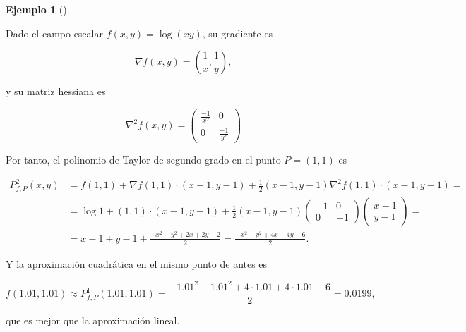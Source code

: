\documentclass[
  a4paper,
]{scrreport}
\theoremstyle{definition}
\theoremstyle{plain}
\theoremstyle{plain}
\theoremstyle{definition}
\theoremstyle{definition}
\newtheorem{example}{Ejemplo}[chapter]
\theoremstyle{plain}
\theoremstyle{remark}
\begin{document}
\begin{example}[]\protect\hypertarget{exm-polinomio-taylor-funcion-varias-variables}{}\label{exm-polinomio-taylor-funcion-varias-variables}

Dado el campo escalar \(f(x,y)=\log(xy)\), su gradiente es

\[
\nabla f(x,y) = \left(\frac{1}{x},\frac{1}{y}\right),
\]

y su matriz hessiana es

\[
\nabla ^2 f(x,y) 
= \left(
\begin{array}{cc}
\frac{-1}{x^2} & 0\\
0 & \frac{-1}{y^2}
\end{array}
\right)
\]

Por tanto, el polinomio de Taylor de segundo grado en el punto
\(P=(1,1)\) es

\begin{align*}
P^2_{f,P}(x,y) &= f(1,1) +\nabla f(1,1)\cdot (x-1,y-1) + \frac{1}{2}(x-1,y-1)\nabla^2f(1,1)\cdot(x-1,y-1)=\\
&= \log 1+(1,1)\cdot(x-1,y-1) + \frac{1}{2}(x-1,y-1)
\left(
\begin{array}{cc}
-1 & 0\\
0 & -1
\end{array}
\right)
\left(
\begin{array}{c}
x-1\\
y-1
\end{array}
\right)
= \\
&= x-1+y-1+\frac{-x^2-y^2+2x+2y-2}{2} = \frac{-x^2-y^2+4x+4y-6}{2}.
\end{align*}

Y la aproximación cuadrática en el mismo punto de antes es

\[
f(1.01,1.01) \approx P^1_{f,P}(1.01,1.01) = \frac{-1.01^2-1.01^2+4\cdot 1.01+4\cdot 1.01-6}{2} = 0.0199,
\]

que es mejor que la aproximación lineal.

\end{example}
\end{document}
